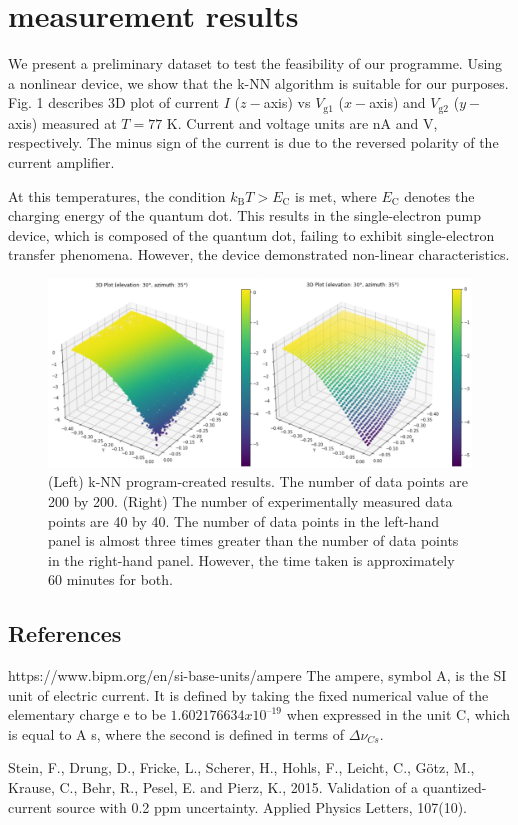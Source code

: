 \documentclass[jkps,preprint,fleqn,showpacs,showkeys]{revtex4}
\begin{document}
\section{measurement results}
We present a preliminary dataset to test the feasibility of our programme.
Using a nonlinear device, we show that the k-NN algorithm is suitable for our purposes.
Fig. 1 describes 3D plot of current $I$ ($z-$axis) vs $V_\text{g1}$ ($x-$axis) and $V_\text{g2}$ ($y-$axis) measured at $T=77$ K. Current and voltage units are nA and V, respectively. 
The minus sign of the current is due to the reversed polarity of the current amplifier. 

At this temperatures, the condition $k_\text{B}T > E_\text{C} $ is met, where $E_\text{C} $ denotes the charging energy of the quantum dot. This results in the single-electron pump device, which is composed of the quantum dot, failing to exhibit single-electron transfer phenomena. However, the device demonstrated non-linear characteristics.

\renewcommand{\figurename}{Fig. }
\begin{figure}[h]
\centering
\includegraphics[width=12cm]{Fig_I_Vg}
\parbox{13cm}{\vspace*{0.5cm}
\caption{(Left) k-NN program-created results. The number of data points are 200 by
200. (Right) The number of experimentally measured data points are 40 by 40. 
The number of data points in the left-hand panel is almost three times greater than the number of data points in the right-hand panel. However, the time taken is approximately 60 minutes for both.}
\label{plot1}}
\end{figure}




\begin{thebibliography}{99}
\section*{References}
https://www.bipm.org/en/si-base-units/ampere
The ampere, symbol A, is the SI unit of electric current. It is defined by taking the fixed numerical value of the elementary charge e to be $1.602 176 634 x 10^{–19}$ when expressed in the unit C, which is equal to A s, where the second is defined in terms of $\Delta \nu _{Cs}$.

Stein, F., Drung, D., Fricke, L., Scherer, H., Hohls, F., Leicht, C., Götz, M., Krause, C., Behr, R., Pesel, E. and Pierz, K., 2015. Validation of a quantized-current source with 0.2 ppm uncertainty. Applied Physics Letters, 107(10).


\end{thebibliography}
\end{document}
